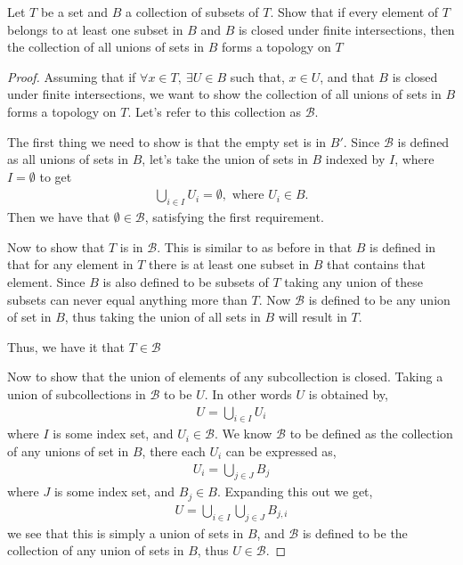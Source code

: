 \documentclass[12pt]{article}
\newcommand      {\BB}        {{\mathscr B}}
\begin{document}
Let $T$ be a set and $B$ a collection of subsets of $T$. Show that if every element of $T$ belongs to at least one subset in $B$ and $B$ is closed under finite intersections, then the collection of all unions of sets in $B$ forms a topology on $T$
\begin{proof}
    Assuming that if $\forall x \in T,\ \exists U \in B$ such that, $x \in U$, and that $B$ is closed under finite intersections, we want to show the collection of all unions of sets in $B$ forms a topology on $T$. Let's refer to this collection as $\BB$.
    
    The first thing we need to show is that the empty set is in $B'$. Since $\BB$ is defined as all unions of sets in $B$, let's take the union of sets in $B$ indexed by $I$, where $I = \emptyset$ to get
    \begin{align*}
        \bigcup_{i\in I}U_i = \emptyset, \text{ where $U_i \in B$}.
    \end{align*}
    Then we have that $\emptyset \in \BB$, satisfying the first requirement. 

    Now to show that $T$ is in $\BB$. 
    This is similar to as before in that $B$ is defined in that for any element in $T$ there is at least one subset in $B$ that contains that element. Since $B$ is also defined to be subsets of $T$ taking any union of these subsets can never equal anything more than $T$. Now $\BB$ is defined to be any     union of set in $B$, thus taking the union of all sets in $B$ will result in $T$.

    Thus, we have it that $T\in \BB$
    \newpage

    Now to show that the union of elements of any subcollection is closed. Taking a union of subcollections in $\BB$ to be $U$. In other words $U$ is obtained by,
    \begin{align*}
        U = \bigcup_{i \in I}U_i 
    \end{align*}
    where $I$ is some index set, and $U_i \in \BB$. We know $\BB$ to be defined as the collection of any unions of set in $B$, there each $U_i$ can be expressed as,
    \begin{align*}
        U_i = \bigcup_{j \in J}B_j
    \end{align*}
    where $J$ is some index set, and $B_j \in B$. Expanding this out we get,
    \begin{align*}
        U = \bigcup_{i\in I}\bigcup_{j \in J}B_{j,i}
    \end{align*}
    we see that this is simply a union of sets in $B$, and $\BB$ is defined to be the collection of any union of sets in $B$, thus $U \in \BB$.


\end{proof}
\end{document}
